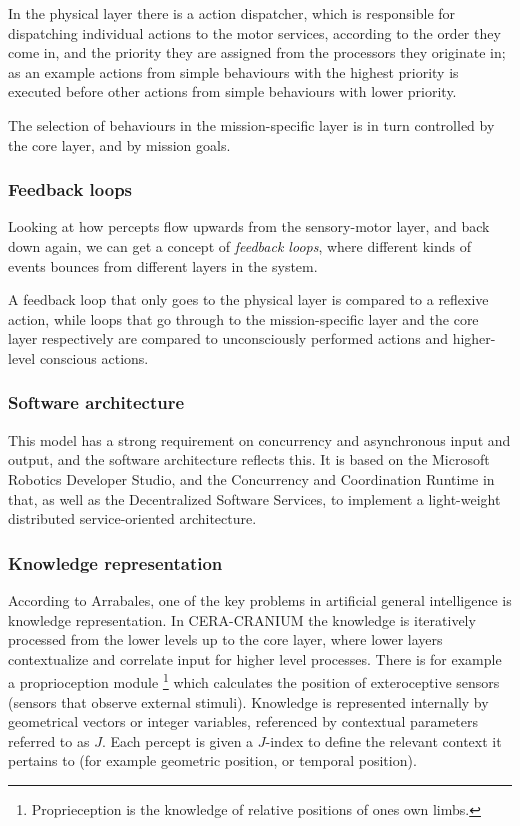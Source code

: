 In the physical layer there is a action dispatcher, which is responsible for
dispatching individual actions to the motor services, according to the order
they come in, and the priority they are assigned from the processors they
originate in; as an example actions from simple behaviours with the highest
priority is executed before other actions from simple behaviours with lower
priority.

The selection of behaviours in the mission-specific layer is in turn controlled
by the core layer, and by mission goals.

\subsubsection{Feedback loops}
Looking at how percepts flow upwards from the sensory-motor layer, and back
down again, we can get a concept of \textit{feedback loops}, where different
kinds of events bounces from different layers in the system.

A feedback loop that only goes to the physical layer is compared to a reflexive
action, while loops that go through to the mission-specific layer and the core
layer respectively are compared to unconsciously performed actions and
higher-level conscious actions.

\subsubsection{Software architecture}
This model has a strong requirement on concurrency and asynchronous input and
output, and the software architecture reflects this. It is based on the
Microsoft Robotics Developer Studio, and the Concurrency and Coordination
Runtime in that, as well as the Decentralized Software Services, to implement a
light-weight distributed service-oriented architecture.

\subsubsection{Knowledge representation}
According to Arrabales\cite{Arrabales2009}, one of the key problems in
artificial general intelligence is knowledge representation. In CERA-CRANIUM
the knowledge is iteratively processed from the lower levels up to the core
layer, where lower layers contextualize and correlate input for higher level
processes. There is for example a proprioception module \footnote{Proprieception
is the knowledge of relative positions of ones own limbs.} which calculates the
position of exteroceptive sensors (sensors that observe external stimuli).
Knowledge is represented internally by geometrical vectors or integer
variables, referenced by contextual parameters referred to as $J$. Each percept
is given a $J$-index to define the relevant context it pertains to (for example
geometric position, or temporal position).

